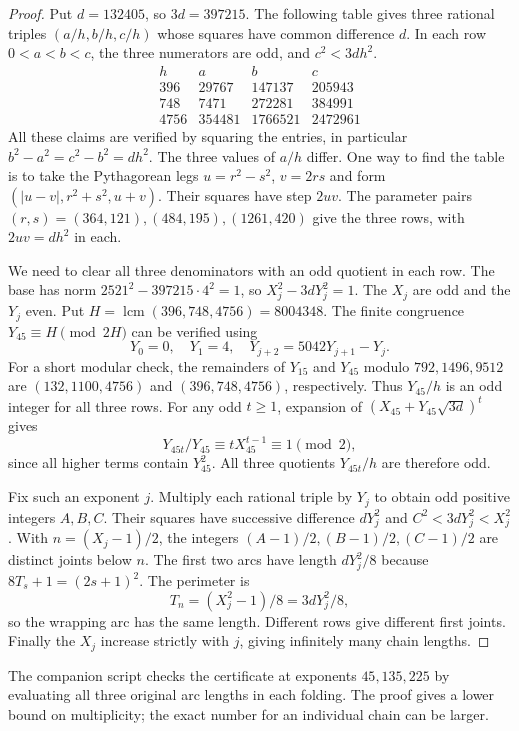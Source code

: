 \documentclass[11pt,letterpaper]{article}
\begin{document}
\begin{proof}
Put $d=132405$, so $3d=397215$. The following table gives three rational triples $(a/h,b/h,c/h)$ whose squares have common difference $d$. In each row $0<a<b<c$, the three numerators are odd, and $c^2<3dh^2$.
\[
\begin{array}{r|rrr}
h & a & b & c\\\hline
396  & 29767  & 147137  & 205943\\
748  & 7471   & 272281  & 384991\\
4756 & 354481 & 1766521 & 2472961
\end{array}
\]
All these claims are verified by squaring the entries, in particular $b^2-a^2=c^2-b^2=dh^2$. The three values of $a/h$ differ. One way to find the table is to take the Pythagorean legs $u=r^2-s^2$, $v=2rs$ and form $(|u-v|,r^2+s^2,u+v)$. Their squares have step $2uv$. The parameter pairs $(r,s)=(364,121),(484,195),(1261,420)$ give the three rows, with $2uv=dh^2$ in each.

We need to clear all three denominators with an odd quotient in each row. The base has norm $2521^2-397215\cdot4^2=1$, so $X_j^2-3dY_j^2=1$. The $X_j$ are odd and the $Y_j$ even. Put $H=\operatorname{lcm}(396,748,4756)=8004348$. The finite congruence $Y_{45}\equiv H\pmod{2H}$ can be verified using
\[
 Y_0=0,\quad Y_1=4,\quad Y_{j+2}=5042Y_{j+1}-Y_j .
\]
For a short modular check, the remainders of $Y_{15}$ and $Y_{45}$ modulo $792,1496,9512$ are $(132,1100,4756)$ and $(396,748,4756)$, respectively. Thus $Y_{45}/h$ is an odd integer for all three rows. For any odd $t\ge1$, expansion of $(X_{45}+Y_{45}\sqrt{3d})^t$ gives
\[
 Y_{45t}/Y_{45}\equiv t X_{45}^{t-1}\equiv1\pmod2 ,
\]
since all higher terms contain $Y_{45}^2$. All three quotients $Y_{45t}/h$ are therefore odd.

Fix such an exponent $j$. Multiply each rational triple by $Y_j$ to obtain odd positive integers $A,B,C$. Their squares have successive difference $dY_j^2$ and $C^2<3dY_j^2<X_j^2$. With $n=(X_j-1)/2$, the integers $(A-1)/2,(B-1)/2,(C-1)/2$ are distinct joints below $n$. The first two arcs have length $dY_j^2/8$ because $8T_s+1=(2s+1)^2$. The perimeter is
\[
 T_n=(X_j^2-1)/8=3dY_j^2/8,
\]
so the wrapping arc has the same length. Different rows give different first joints. Finally the $X_j$ increase strictly with $j$, giving infinitely many chain lengths.
\end{proof}

\noindent The companion script checks the certificate at exponents $45,135,225$ by evaluating all three original arc lengths in each folding. The proof gives a lower bound on multiplicity; the exact number for an individual chain can be larger.
\end{document}
